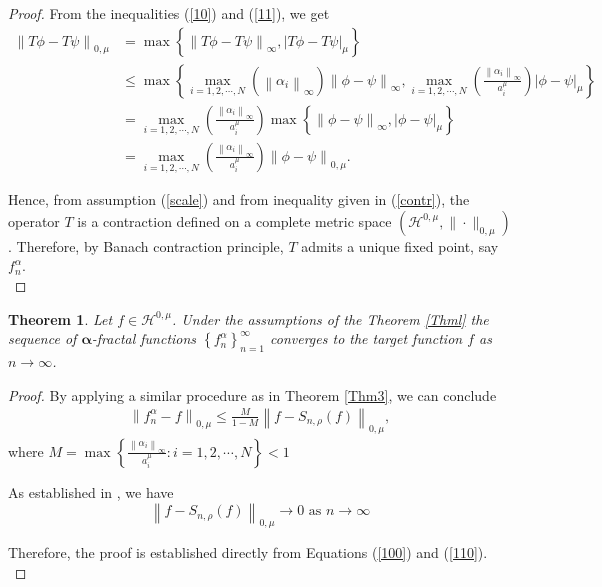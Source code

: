 \documentclass{article}[12pt, a4]
\newtheorem{theorem}{\large Theorem}[section]
\begin{document}
\begin{proof}
		From the inequalities (\ref{10}) and (\ref{11}), we get
		\begin{align}\label{contr}
			\left\|T\phi - T\psi\right\|_{0, \mu} & =\max \left\{\left\|T\phi - T\psi\right\|_{\infty},\left|T\phi - T\psi\right|_{\mu}\right\}\nonumber \\
			& \leq \max \left\{\max _{i =1,2,\cdots,N}\left(\left\|\alpha_{i}\right\|_{\infty}\right)\left\|\phi - \psi\right\|_{\infty}, \max _{i =1,2,\cdots,N}\left(\frac{\left\|\alpha_{i}\right\|_{\infty}}{a_{i}^{\mu}}\right)\left|\phi - \psi\right|_{\mu}\right\} \nonumber \\
			& =\max _{i =1,2,\cdots,N}\left(\frac{\left\|\alpha_{i}\right\|_{\infty}}{a_{i}^{\mu}}\right) \max \left\{\left\|\phi - \psi\right\|_{\infty},\left|\phi - \psi\right|_{\mu}\right\} \nonumber\\
			& =\max _{i =1,2,\cdots,N}\left(\frac{\left\|\alpha_{i}\right\|_{\infty}}{a_{i}^{\mu}}\right)\left\|\phi - \psi\right\|_{0, \mu} .
		\end{align}
		
		Hence, from assumption (\ref{scale}) and from inequality given in (\ref{contr}), the operator $T$ is a contraction defined on a complete metric space $\left(\mathcal{H}^{0,\mu}, \|\cdot\|_{0, \mu}\right)$. Therefore, by Banach contraction principle, $T$ admits a unique fixed point, say $f_{n}^{\alpha}$. \\
	\end{proof}
	
	\begin{theorem}	
		Let $f \in \mathcal{H}^{0,\mu}$. Under the assumptions of the Theorem \ref{Thml} the sequence of $\boldsymbol{\alpha}$-fractal functions $\left\{f_{n}^{\alpha}\right\}_{n=1}^{\infty}$ converges to the target function $f$ as $n \rightarrow \infty$.\\
	\end{theorem}
	
	\begin{proof}
		
		By applying a similar procedure as in Theorem \ref{Thm3}, we can conclude
		\begin{align}\label{100}
			\left\|f_{n}^{\alpha}-f\right\|_{0, \mu} \leq \frac{M}{1-M}\left\|f-S_{n,\rho}(f)\right\|_{0, \mu},
		\end{align}
		where  $M=\max \left\{\frac{\left\|\alpha_{i}\right\|_{\infty}}{a_{i}^{\mu}}: i =1,2,\cdots,N\right\}<1 $
		
		As established in \cite{QIAN2022126781}, we have
		\begin{equation}\label{110}
			\left\|f-S_{n,\rho}(f)\right\|_{0, \mu} \rightarrow 0 \text { as } n \rightarrow \infty 
		\end{equation}
		
		Therefore, the proof is established directly from Equations (\ref{100}) and (\ref{110}).\\
	\end{proof} 
	
\end{document}
